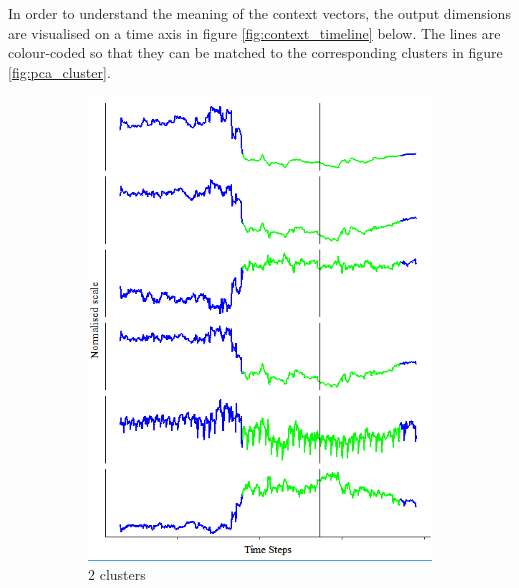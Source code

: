 \documentclass[11pt]{article} %
\theoremstyle{plain}
\theoremstyle{definition}
\begin{document}
In order to understand the meaning of the context vectors, the output dimensions are visualised on a time axis in figure \ref{fig:context_timeline} below. The lines are colour-coded so that they can be matched to the corresponding clusters in figure \ref{fig:pca_cluster}.

\begin{figure}[H]
	\centering
	
	\begin{subfigure}[b]{0.4\textwidth}
		\includegraphics[width=\textwidth]{context_timeline_2.PNG}
		\caption{\(2\) clusters}
		\label{fig:context_timeline_2}
	\end{subfigure}
	~
	\begin{subfigure}[b]{0.4\textwidth}

\end{subfigure}
\end{figure}
\end{document}

